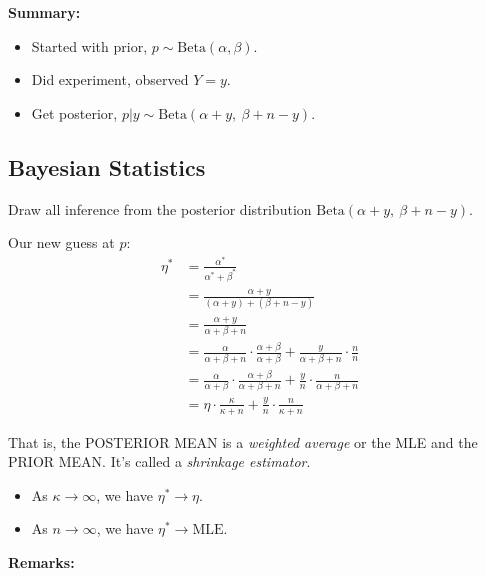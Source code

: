 \documentclass[11pt,english]{scrbook}
\begin{document}
\begin{enumerate}
\begin{enumerate}
\textbf{Summary:}
\begin{itemize}
\item Started with prior, \(p \sim \mathrm{Beta}(\alpha,\beta).\)
\item Did experiment, observed \(Y = y\).
\item Get posterior, \(p|y \sim \mathrm{Beta}(\alpha + y,\ \beta + n - y).\)
\end{itemize}
\end{enumerate}
\end{enumerate}

\subsection{Bayesian Statistics}
\label{sec:org6dcfe83}
Draw all inference from the posterior distribution \(\mathrm{Beta}(\alpha + y,\ \beta + n - y)\).

Our new guess at \(p\):
\begin{align*}
\eta^{\ast} &= \frac{\alpha^{\ast}}{\alpha^{\ast}+\beta^{\ast}} \\
&= \frac{\alpha + y}{(\alpha + y) + (\beta + n - y)} \\
&= \frac{\alpha + y}{\alpha + \beta + n} \\
&= \frac{\alpha}{\alpha + \beta + n}\cdot\frac{\alpha + \beta}{\alpha + \beta} + \frac{y}{\alpha + \beta + n}\cdot\frac{n}{n} \\
&= \frac{\alpha}{\alpha + \beta}\cdot\frac{\alpha + \beta}{\alpha + \beta + n} + \frac{y}{n}\cdot\frac{n}{\alpha + \beta + n} \\
&= \eta\cdot\frac{\kappa}{\kappa + n} + \frac{y}{n}\cdot\frac{n}{\kappa + n}
\end{align*}

That is, the POSTERIOR MEAN is a \emph{weighted average} or the MLE and the PRIOR MEAN.  It's called a \emph{shrinkage estimator}.

\begin{itemize}
\item As \(\kappa \to \infty\), we have \(\eta^{\ast} \to \eta\).
\item As \(n \to \infty\), we have \(\eta^{\ast} \to \mathrm{MLE}\).
\end{itemize}

\textbf{Remarks:}
\end{document}
